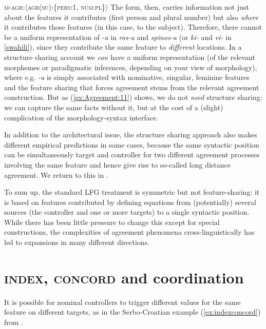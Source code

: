 \documentclass[output=paper,hidelinks]{langscibook}
\begin{document}
\ea\label{ex:Agreement:11} \textsc{m-agr}:$\langle$\textsc{agr(su):\{pers:1, num:pl\}}$\rangle$
\z
%
The form, then, carries information not just about the features it
contributes (first person and plural number) but also \emph{where} it
contributes those features (in this case, to the subject). Therefore,
there cannot be a uniform representation of -\textit{a} in
\textit{ros-a} and \textit{spinos-a} (or \textit{ki-} and \textit{vi-}
in \ref{swahili}), since they contribute the same
feature to \emph{different} locations. In a structure sharing account
we \emph{can} have a uniform representation (of the relevant morphemes
or paradigmatic inferences, depending on your view of morphology),
where e.g. \textit{-a} is simply associated with nominative,
singular, feminine features and the feature sharing that forces
agreement stems from the relevant agreement construction. But as
(\ref{ex:Agreement:11}) shows, we do not \emph{need} structure sharing: we can capture
the same facts without it, but at the cost of a (slight) complication
of the morphology-syntax interface.

\hspace*{-2pt}In addition to the architectural issue, the structure sharing approach
also makes different empirical predictions in some cases, because the
same syntactic position can be simultaneously target and controller for
two different agreement processes involving the same feature and hence
give rise to so-called long distance agreement. We return to this in
.

To sum up, the standard LFG treatment is symmetric but not feature-sharing: it
is based on features contributed by defining equations from
(potentially) several sources (the controller and one or more targets)
to a single syntactic position. While there has been little pressure to
change this except for special constructions, the complexities of
agreement phenomena cross-linguistically has led to expansions in many
different directions.

\section{\textsc{index, concord} and coordination}\label{sec:indexconcord} 
%
It is possible for nominal controllers to trigger different values for
the same feature on different targets, as in the Serbo-Croatian example (\ref{ex:indexconcord}) from \citet[5]{WechslerZlatic:Agreement2003}.
\end{document}
